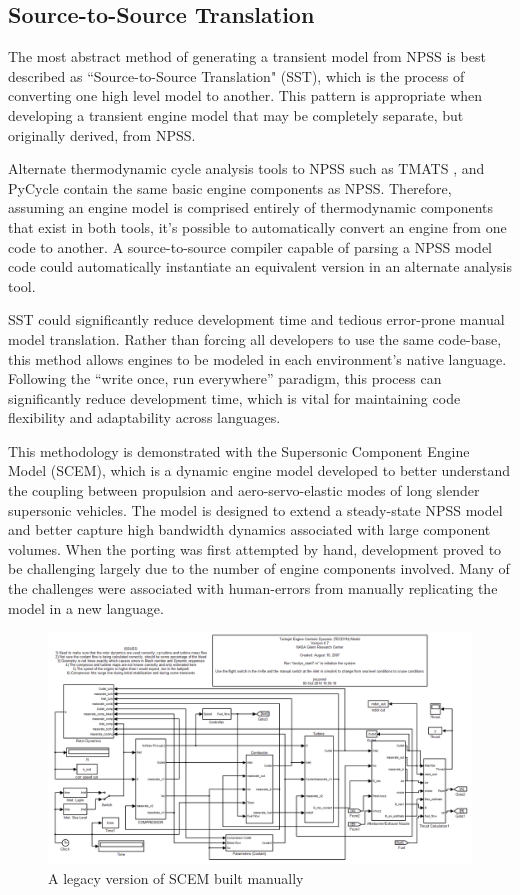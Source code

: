 \documentclass[heading.tex]{subfiles}
\begin{document}
\subsection{Source-to-Source Translation}

The most abstract method of generating a transient model from NPSS
is best described as ``Source-to-Source Translation"
(SST), which is the process of converting one high level model to another.
This pattern is appropriate when developing
a transient engine model that may be completely separate, but originally derived, from NPSS.

Alternate thermodynamic cycle analysis tools to NPSS such as TMATS \cite{TMATS} \cite{TMATS-NPSS},
and PyCycle \cite{Pycycle} contain the same basic engine components as NPSS.
Therefore, assuming an engine model is comprised entirely of
thermodynamic components that exist in both tools,
it's possible to automatically convert an engine from one code to another.
A source-to-source compiler capable of parsing a NPSS model code could automatically
instantiate an equivalent version in an alternate analysis tool.

SST could significantly reduce development time and tedious error-prone manual model translation.
Rather than forcing all developers to use the same code-base,
this method allows engines to be modeled in each environment's native language.
Following the ``write once, run everywhere'' paradigm,
this process can significantly reduce development time,
which is vital for maintaining code flexibility and adaptability across languages.

This methodology is demonstrated with the Supersonic Component Engine Model (SCEM),
which is a dynamic engine model
developed to better understand the coupling between propulsion and aero-servo-elastic modes of long slender
supersonic vehicles. \cite{Volume Dynamic} \cite{Turbofan}
The model is designed to extend a steady-state NPSS model
and better capture high bandwidth dynamics associated with large component volumes. 
When the porting was first attempted by hand, 
development proved to be challenging largely due to the number of engine components involved.
Many of the challenges were associated with human-errors from manually replicating the model in a new language. 

\begin{figure}[H]
\centering
\includegraphics[width=1.0\textwidth]{images/original_scem_model}
\caption{A legacy version of SCEM built manually}
\label{f:legacySCEM}
\end{figure}
\end{document}
